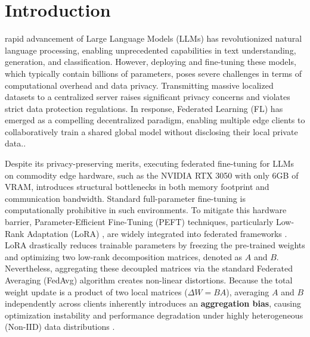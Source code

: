 %
\IEEEpeerreviewmaketitle



\section{Introduction}
% 
% 
% 
% 
rapid advancement of Large Language Models (LLMs) has revolutionized natural language processing, enabling unprecedented capabilities in text understanding, generation, and classification. However, deploying and fine-tuning these models, which typically contain billions of parameters, poses severe challenges in terms of computational overhead and data privacy. Transmitting massive localized datasets to a centralized server raises significant privacy concerns and violates strict data protection regulations. In response, Federated Learning (FL) has emerged as a compelling decentralized paradigm, enabling multiple edge clients to collaboratively train a shared global model without disclosing their local private data.\cite{mcmahan2017communication, kairouz2021advances}.

Despite its privacy-preserving merits, executing federated fine-tuning for LLMs on commodity edge hardware, such as the NVIDIA RTX 3050 with only 6GB of VRAM, introduces structural bottlenecks in both memory footprint and communication bandwidth. Standard full-parameter fine-tuning is computationally prohibitive in such environments. To mitigate this hardware barrier, Parameter-Efficient Fine-Tuning (PEFT) techniques, particularly Low-Rank Adaptation (LoRA) \cite{hu2021lora}, are widely integrated into federated frameworks \cite{zhang2023fedpet}. LoRA drastically reduces trainable parameters by freezing the pre-trained weights and optimizing two low-rank decomposition matrices, denoted as $A$ and $B$. Nevertheless, aggregating these decoupled matrices via the standard Federated Averaging (FedAvg) algorithm creates non-linear distortions. Because the total weight update is a product of two local matrices ($\Delta W = BA$), averaging $A$ and $B$ independently across clients inherently introduces an \textbf{aggregation bias}, causing optimization instability and performance degradation under highly heterogeneous (Non-IID) data distributions \cite{zhao2018federated}.



